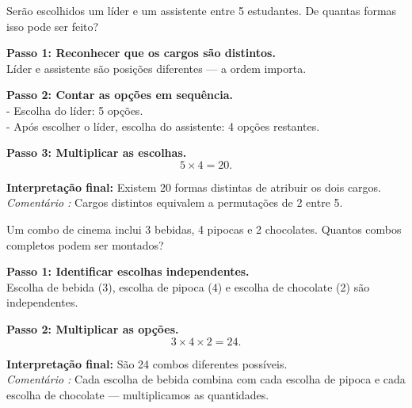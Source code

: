 \documentclass[11pt]{article}
\begin{document}
\begin{tcolorbox}[title=\textbf{Questão 9}, colback=blue!6, colframe=blue!70!black]
Serão escolhidos um líder e um assistente entre 5 estudantes. De quantas formas isso pode ser feito?
\end{tcolorbox}

\begin{tcolorbox}[title=\textbf{Solução 9}, colback=green!6, colframe=green!60!black]
\textbf{Passo 1: Reconhecer que os cargos são distintos.}\\
Líder e assistente são posições diferentes — a ordem importa.

\textbf{Passo 2: Contar as opções em sequência.}\\
- Escolha do líder: 5 opções.\\
- Após escolher o líder, escolha do assistente: 4 opções restantes.

\textbf{Passo 3: Multiplicar as escolhas.}\\
\[
5 \times 4 = 20.
\]

\textbf{Interpretação final:} Existem 20 formas distintas de atribuir os dois cargos.\\
\emph{Comentário :} Cargos distintos equivalem a permutações de 2 entre 5.
\end{tcolorbox}


\begin{tcolorbox}[title=\textbf{Questão 10}, colback=blue!6, colframe=blue!70!black]
Um combo de cinema inclui 3 bebidas, 4 pipocas e 2 chocolates. Quantos combos completos podem ser montados?
\end{tcolorbox}

\begin{tcolorbox}[title=\textbf{Solução 10}, colback=green!6, colframe=green!60!black]
\textbf{Passo 1: Identificar escolhas independentes.}\\
Escolha de bebida (3), escolha de pipoca (4) e escolha de chocolate (2) são independentes.

\textbf{Passo 2: Multiplicar as opções.}\\
\[
3 \times 4 \times 2 = 24.
\]

\textbf{Interpretação final:} São 24 combos diferentes possíveis.\\
\emph{Comentário :} Cada escolha de bebida combina com cada escolha de pipoca e cada escolha de chocolate — multiplicamos as quantidades.
\end{tcolorbox}
\end{document}
